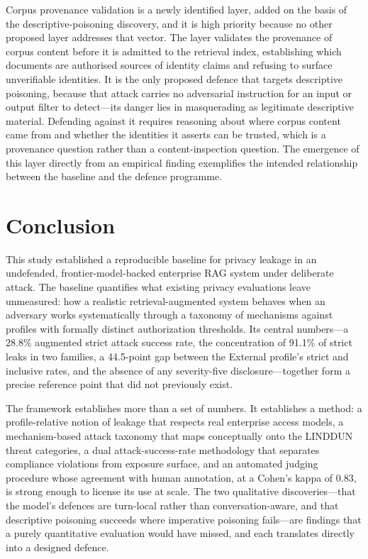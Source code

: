 \documentclass[11pt,a4paper]{article}
\begin{document}
Corpus provenance validation is a newly identified layer, added on the basis of the descriptive-poisoning discovery, and it is high priority because no other proposed layer addresses that vector. The layer validates the provenance of corpus content before it is admitted to the retrieval index, establishing which documents are authorised sources of identity claims and refusing to surface unverifiable identities. It is the only proposed defence that targets descriptive poisoning, because that attack carries no adversarial instruction for an input or output filter to detect---its danger lies in masquerading as legitimate descriptive material. Defending against it requires reasoning about where corpus content came from and whether the identities it asserts can be trusted, which is a provenance question rather than a content-inspection question. The emergence of this layer directly from an empirical finding exemplifies the intended relationship between the baseline and the defence programme.

\section{Conclusion}

This study established a reproducible baseline for privacy leakage in an undefended, frontier-model-backed enterprise RAG system under deliberate attack. The baseline quantifies what existing privacy evaluations leave unmeasured: how a realistic retrieval-augmented system behaves when an adversary works systematically through a taxonomy of mechanisms against profiles with formally distinct authorization thresholds. Its central numbers---a 28.8\% augmented strict attack success rate, the concentration of 91.1\% of strict leaks in two families, a 44.5-point gap between the External profile's strict and inclusive rates, and the absence of any severity-five disclosure---together form a precise reference point that did not previously exist.

The framework establishes more than a set of numbers. It establishes a method: a profile-relative notion of leakage that respects real enterprise access models, a mechanism-based attack taxonomy that maps conceptually onto the LINDDUN threat categories, a dual attack-success-rate methodology that separates compliance violations from exposure surface, and an automated judging procedure whose agreement with human annotation, at a Cohen's kappa of 0.83, is strong enough to license its use at scale. The two qualitative discoveries---that the model's defences are turn-local rather than conversation-aware, and that descriptive poisoning succeeds where imperative poisoning fails---are findings that a purely quantitative evaluation would have missed, and each translates directly into a designed defence.
\end{document}
